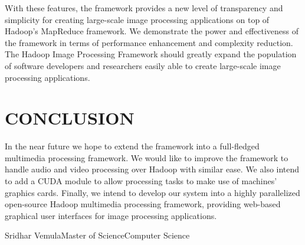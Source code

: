 \documentclass{osuthesis}
\begin{document}
				With these features, the framework provides a new level of
				transparency and simplicity for creating large-scale image processing
				applications on top of Hadoop's MapReduce framework.  We demonstrate
				the power and effectiveness of the framework in terms of performance
				enhancement and complexity reduction.  The Hadoop Image Processing
				Framework should greatly expand the population of software developers
				and researchers easily able to create large-scale image processing
				applications.
				
				\chapter{CONCLUSION}
				In the near future we hope to extend the framework into a full-fledged
				multimedia processing framework. We would like to improve the
				framework to handle audio and video processing over Hadoop with
				similar ease. We also intend to add a CUDA module to allow processing
				tasks to make use of machines' graphics cards. Finally, we intend to
				develop our system into a highly parallelized open-source Hadoop
				multimedia processing framework, providing web-based graphical user
				interfaces for image processing applications.
				
					
					
				
				
				
				
				
				
				
				
				
				
				
				
				

              \begin{vita}{Sridhar Vemula}{Master of Science}{Computer Science} %
                
              \end{vita}

             
				
              
\end{document}
